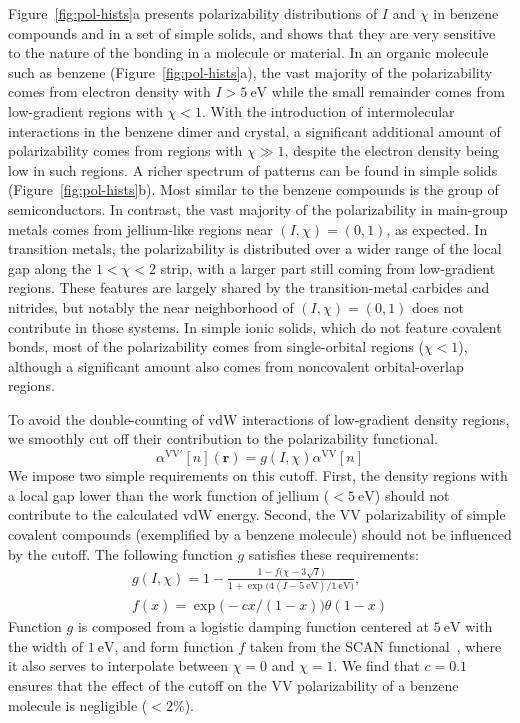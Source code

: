 Figure~\ref{fig:pol-hists}a presents polarizability distributions of $I$ and $\chi$ in benzene compounds and in a set of simple solids, and shows that they are very sensitive to the nature of the bonding in a molecule or material.
In an organic molecule such as benzene (Figure~\ref{fig:pol-hists}a), the vast majority of the polarizability
comes from electron density with $I>\SI{5}{\electronvolt}$ while the small remainder comes
from low-gradient regions with $\chi<1$.
With the introduction of intermolecular interactions in the benzene dimer and crystal, a significant additional amount of polarizability comes from regions with $\chi\gg1$, despite the electron density being low in such regions.
A richer spectrum of patterns can be found in simple solids (Figure~\ref{fig:pol-hists}b).
Most similar to the benzene compounds is the group of semiconductors.
In contrast, the vast majority of the polarizability in main-group metals comes from jellium-like regions near $(I,\chi)=(0,1)$, as expected.
In transition metals, the polarizability is distributed over a wider range of the local gap along the $1<\chi<2$ strip, with a larger part still coming from low-gradient regions.
These features are largely shared by the transition-metal carbides and nitrides, but notably the near neighborhood of $(I,\chi)=(0,1)$ does not contribute in those systems.
In simple ionic solids, which do not feature covalent bonds, most of the polarizability comes from single-orbital regions ($\chi<1$), although a significant amount also comes from noncovalent orbital-overlap regions.

To avoid the double-counting of vdW interactions of low-gradient density regions, we smoothly cut off their contribution to the polarizability functional.
\begin{equation}
  \alpha^\mathrm{VV'}[n](\mathbf r)=g(I,\chi)\alpha^\text{VV}[n]
\end{equation}
We impose two simple requirements on this cutoff.
First, the density regions with a local gap lower than the work function of jellium ($<\SI{5}{\electronvolt}$) should not contribute to the calculated vdW energy.
Second, the VV polarizability of simple covalent compounds (exemplified by a benzene molecule) should not be influenced by the cutoff.
The following function $g$ satisfies these requirements:
\begin{gather}
  g(I,\chi)=1-\frac{1-f\bigl(\chi-3\sqrt{I}\bigr)}{1+\exp\bigl(4(I-\SI{5}{\electronvolt})/\SI{1}{\electronvolt}\bigr)}, \\
  f(x)=\exp\bigl(-cx/(1-x)\bigr)\theta(1-x)
\end{gather}
Function $g$ is composed from a logistic damping function centered at $\SI{5}{\electronvolt}$ with the width of $\SI{1}{\electronvolt}$, and form function $f$ taken from the SCAN functional~\citep{SunPRL15}, where it also serves to interpolate between $\chi=0$ and $\chi=1$.
We find that $c=0.1$ ensures that the effect of the cutoff on the VV polarizability of a benzene molecule is negligible ($<2\%$).

